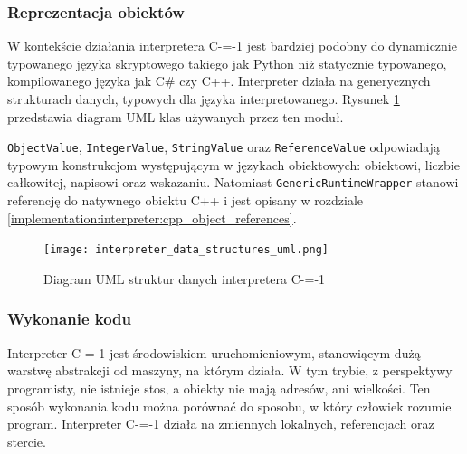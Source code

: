 \subsubsection{Reprezentacja obiektów}
\label{implementation:interpreter:object_representation}

W kontekście działania interpretera C-=-1 jest bardziej podobny do dynamicznie typowanego języka skryptowego takiego jak Python \cite{van1995python} niż statycznie typowanego, kompilowanego języka jak C\# czy C++.
Interpreter działa na generycznych strukturach danych, typowych dla języka interpretowanego.
Rysunek \ref{implementation:data_structures:uml_diagram} przedstawia diagram UML klas używanych przez ten moduł.

\lstinline{ObjectValue}, \lstinline{IntegerValue}, \lstinline{StringValue} oraz \lstinline{ReferenceValue} odpowiadają typowym konstrukcjom występującym w językach obiektowych: obiektowi, liczbie całkowitej, napisowi oraz wskazaniu.
Natomiast \lstinline{GenericRuntimeWrapper} stanowi referencję do natywnego obiektu C++ i jest opisany w rozdziale \ref{implementation:interpreter:cpp_object_references}.


\begin{figure}
  \caption{Diagram UML struktur danych interpretera C-=-1}
  \label{implementation:data_structures:uml_diagram}
  \texttt{[image: interpreter\_data\_structures\_uml.png]}
\end{figure}

\subsubsection{Wykonanie kodu}
\label{implementation:interpreter:code_execution}

Interpreter C-=-1 jest środowiskiem uruchomieniowym, stanowiącym dużą warstwę abstrakcji od maszyny, na którym działa.
W tym trybie, z perspektywy programisty, nie istnieje stos, a obiekty nie mają adresów, ani wielkości.
Ten sposób wykonania kodu można porównać do sposobu, w który człowiek rozumie program.
Interpreter C-=-1 działa na zmiennych lokalnych, referencjach oraz stercie.


